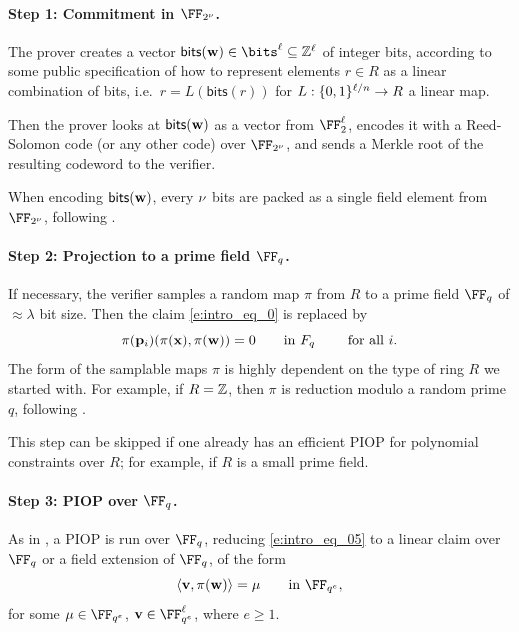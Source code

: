 \documentclass[11pt,letterpaper,usenames,dvipsnames]{article}
\begin{document}
 \paragraph{Step 1: Commitment in $\comfield$.} The prover creates a vector $\mathsf{bits}(\ww) \in \bits^{\codedim} \subseteq \ZZ^{\codedim}$ of integer bits, according to some public specification of how to represent elements  $r\in R$ as a linear combination of  bits, i.e.\ $r=L(\mathsf{bits}(r))$ for $L: \{0,1\}^{\ell/n}\to R$ a linear map. 

     Then the prover looks at $\mathsf{bits}(\mathbf{w})$ as a vector from $\FF_2^{\codedim}$, encodes it with a Reed-Solomon code (or any other code) over $\comfield$, and sends a Merkle root of the resulting codeword to the verifier. 

     When encoding $\mathsf{bits}(\mathbf{w})$, every $\nu$ bits are packed as a single field element from $\comfield$, following \cite{binius}.
     \paragraph{Step 2: Projection to a   prime field $\FF_q$.}  If necessary, the verifier samples a random map $\pi$ from $R$ to a prime field $\FF_q$ of $\approx \lambda$ bit size. Then the claim \eqref{e:intro_eq_0} is replaced by
\begin{equation}\label{e:intro_eq_05}\pi(\mathbf{p}_i)(\pi(\mathbf{x}),\pi(\mathbf{w}))=0 \qquad \text{in  } F_q \qquad \text{ for all } i.\end{equation} 
The form of the samplable maps $\pi$ is highly dependent on the type of ring $R$ we started with. For example, if $R=\mathbb{Z}$, then $\pi$ is reduction modulo a random prime $q$, following \cite{zaratan}.

This step can be skipped if one already has an efficient PIOP for polynomial constraints over $R$; for example, if $R$ is a small prime field.
     \paragraph{Step 3: PIOP over $\FF_q$.} As in \cite{zaratan,zincplus}, a PIOP is run over $\FF_q$, reducing \eqref{e:intro_eq_05} to a linear claim over $\FF_q$ or a field extension of $\FF_q$, of the form
\begin{equation}\label{e:intro_eq_1}
\langle \vv, \pi(\ww)\rangle =\mu \qquad \text{in } \FF_{q^e},
\end{equation}
for some $\mu\in\FF_{q^e}$, $\vv\in \FF_{q^e}^\codedim$, where $e\geq 1$. 
\end{document}
